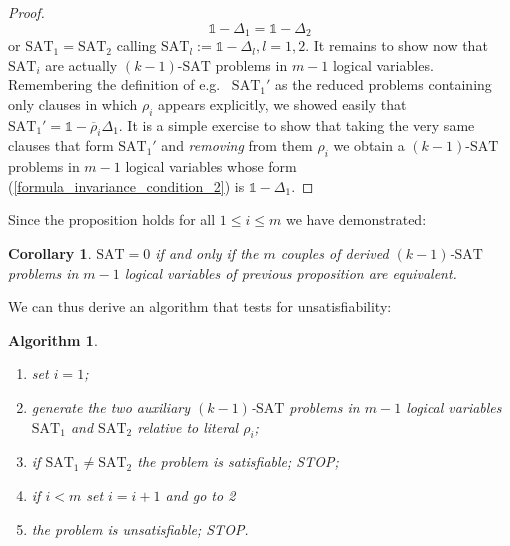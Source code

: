 \documentclass[a4paper,twoside,11pt]{article}
\newtheorem{MS_Corollary}[MS_Proposition]{Corollary}
\newtheorem{MS_Algorithm}{Algorithm}
\begin{document}
\begin{proof}
$$
{\ensuremath{\mathbb{1}}} - \Delta_1 = {\ensuremath{\mathbb{1}}} - \Delta_2
$$
or ${\ensuremath{\mbox{SAT}}}_1 = {\ensuremath{\mbox{SAT}}}_2$ calling ${\ensuremath{\mbox{SAT}}}_l := {\ensuremath{\mathbb{1}}} - \Delta_l, l = 1,2$. It remains to show now that ${\ensuremath{\mbox{SAT}}}_i$ are actually $(k-1)$-{\ensuremath{\mbox{SAT}}}{} problems in $m - 1$ logical variables. Remembering the definition of {e.g.\ } ${\ensuremath{\mbox{SAT}}}_1'$ as the reduced problems containing only clauses in which ${\ensuremath{\rho}}_i$ appears explicitly, we showed easily that ${\ensuremath{\mbox{SAT}}}_1' = {\ensuremath{\mathbb{1}}} - {\overline{\ensuremath{\rho}}}_i \Delta_1$. It is a simple exercise to show that taking the very same clauses that form ${\ensuremath{\mbox{SAT}}}_1'$ and \emph{removing} from them ${\ensuremath{\rho}}_i$ we obtain a $(k-1)$-{\ensuremath{\mbox{SAT}}}{} problems in $m - 1$ logical variables whose form (\ref{formula_invariance_condition_2}) is ${\ensuremath{\mathbb{1}}} - \Delta_1$.
\end{proof}

Since the proposition holds for all $1 \le i \le m$ we have demonstrated:
\begin{MS_Corollary}
\label{unsatisfiability}
${\ensuremath{\mbox{SAT}}} = 0$ if and only if the $m$ couples of derived $(k-1)$-{\ensuremath{\mbox{SAT}}}{} problems in $m - 1$ logical variables of previous proposition are equivalent.
\end{MS_Corollary}

We can thus derive an algorithm that tests for unsatisfiability:
\begin{MS_Algorithm}
\label{unSAT_algorithm_outline}
{}~{}

\begin{enumerate}
\item set $i = 1$;
\item generate the two auxiliary $(k-1)$-{\ensuremath{\mbox{SAT}}}{} problems in $m - 1$ logical variables ${\ensuremath{\mbox{SAT}}}_1$ and ${\ensuremath{\mbox{SAT}}}_2$ relative to literal ${\ensuremath{\rho}}_i$;
\item if ${\ensuremath{\mbox{SAT}}}_1 \ne {\ensuremath{\mbox{SAT}}}_2$ the problem is satisfiable; STOP;
\item if $i < m$ set $i = i + 1$ and go to 2
\item the problem is unsatisfiable; STOP.
\end{enumerate}
\end{MS_Algorithm}
\end{document}
